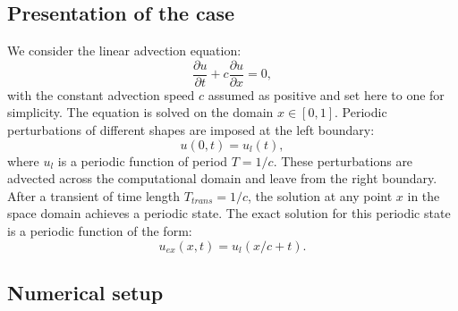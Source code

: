 
\subsection{Presentation of the case}

We consider the linear advection equation:
\begin{equation}
  \label{eq:convection}
  \frac{\partial u}{\partial t} + c \frac{\partial u}{\partial x} = 0,
\end{equation}
with the constant advection speed $c$ assumed as positive
and set here to one for simplicity. 
The equation is solved on the domain $x \in [0, 1]$. 
Periodic perturbations of different shapes are imposed at the left boundary:
\begin{equation}
   u(0, t) = u_l (t),
\end{equation}
where $u_l$ is a periodic function of period $T=1/c$.
These perturbations are advected across the computational 
domain and leave from the right boundary. After a transient of time length $T_{trans}=1/c$, 
the solution at any point $x$ in the space domain achieves a periodic state. 
The exact solution for this periodic state is a periodic function of the form:
\begin{equation}
    u_{ex}(x,t)=u_l(x/c+t).
\end{equation}

\subsection{Numerical setup}

